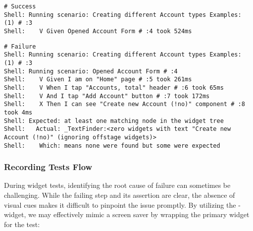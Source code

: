 \begin{lstlisting}[language=terminal]
# Success
Shell: Running scenario: Creating different Account types Examples: (1) # :3
Shell:    V Given Opened Account Form # :4 took 524ms
\end{lstlisting}
\newpage
\begin{lstlisting}[language=terminal]
# Failure
Shell: Running scenario: Creating different Account types Examples: (1) # :3
Shell: Running scenario: Opened Account Form # :4
Shell:    V Given I am on "Home" page # :5 took 261ms
Shell:    V When I tap "Accounts, total" header # :6 took 65ms
Shell:    V And I tap "Add Account" button # :7 took 172ms
Shell:    X Then I can see "Create new Account (!no)" component # :8 took 4ms  
Shell: Expected: at least one matching node in the widget tree
Shell:   Actual: _TextFinder:<zero widgets with text "Create new Account (!no)" (ignoring offstage widgets)>
Shell:    Which: means none were found but some were expected
\end{lstlisting}


\subsubsection{Recording Tests Flow} \label{t-record}

During widget tests, identifying the root cause of failure can sometimes be challenging. While the failing step and 
its assertion are clear, the absence of visual cues makes it difficult to pinpoint the issue promptly. By utilizing the 
-widget, we may effectively mimic a screen saver by wrapping the primary widget for the test:

